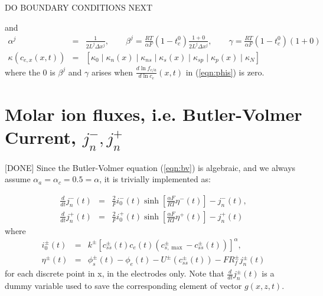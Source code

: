 \documentclass[12pt]{article}
\begin{document}
DO BOUNDARY CONDITIONS NEXT

and
\begin{eqnarray}
	\alpha^{j} &=& \frac{1}{2 L^{j} \Delta x^{j}}, \qquad \beta^{j} = \frac{RT}{\alpha F} (1-t_{c}^{0})\frac{1 + 0}{2 L^{j} \Delta x^{j}}, \qquad \gamma = \frac{RT}{\alpha F} (1-t_{c}^{0}) (1 + 0) \\
	\kappa(c_{e,x}(x,t)) &=& \left[ \kappa_{0} \mid \kappa_{n}(x) \mid \kappa_{ns} \mid \kappa_{s}(x) \mid \kappa_{sp} \mid \kappa_{p}(x) \mid \kappa_{N} \right]
\end{eqnarray}
where the $0$ is $\beta^{j}$ and $\gamma$ arises when $\frac{d \ln f_{c/a}}{d \ln c_{e}}(x,t)$ in (\ref{eqn:phis}) is zero. 

\section{Molar ion fluxes, i.e. Butler-Volmer Current, $j_{n}^{-}, j_{n}^{+}$}\label{sec:jn}
[DONE] Since the Butler-Volmer equation (\ref{eqn:bv}) is algebraic, and we always assume $\alpha_{a} = \alpha_{c} = 0.5 = \alpha$, it is trivially implemented as:

\begin{eqnarray}
	\frac{d}{dt} j_{n}^{-}(t) &=& \frac{2}{F} i_{0}^{-}(t) \sinh \left[ \frac{\alpha F}{RT} \eta^{-}(t) \right] - j_{n}^{-}(t), \\
	\frac{d}{dt} j_{n}^{+}(t) &=& \frac{2}{F} i_{0}^{+}(t) \sinh \left[ \frac{\alpha F}{RT} \eta^{+}(t) \right] - j_{n}^{+}(t)
\end{eqnarray}
where
\begin{eqnarray}
	i_{0}^{\pm}(t) &=& k^{\pm}  \left[ c_{ss}^{\pm}(t) c_{e}(t) \left(c_{s,\max}^{\pm} - c_{ss}^{\pm}(t)  \right) \right]^{\alpha}, \label{eqn:i0} \\
	\eta^{\pm}(t) &=& \phi_{s}^{\pm}(t) - \phi_{e}(t) - U^{\pm}(c_{ss}^{\pm}(t)) - F R_{f}^{\pm} j_{n}^{\pm}(t)
\end{eqnarray}
for each discrete point in x, in the electrodes only. Note that $\frac{d}{dt} j_{n}^{\pm}(t)$ is a dummy variable used to save the corresponding element of vector $g(x,z,t)$.




\footnotesize

\end{document}
